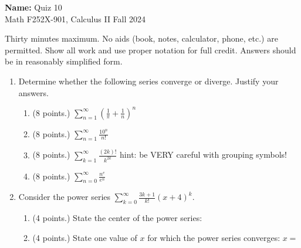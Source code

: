\documentclass[12pt]{article}
\newcommand{\ds}{\displaystyle}
\newcommand{\points}[1]{(#1 points.)}		%
\begin{document}
\pagestyle{plain}

\noindent \textbf{Name:} \underline{\hspace{15em}}		\hfill	Quiz 10 \\
           Math F252X-901, Calculus II  			\hfill	Fall 2024 	

                \vspace{1cm}
                
Thirty minutes maximum. No aids (book, notes,
calculator, phone, etc.) are permitted. Show all work and use proper
notation for full credit. Answers should be in reasonably simplified
form.

\begin{enumerate}

\item Determine whether the following series converge or
  diverge. Justify your answers.

  \begin{enumerate}

  \item \points{8} $\ds \sum_{n=1}^{\infty} \left( \frac{1}{\pi} + \frac{1}{n}
    \right)^n$
    \vfill
    
  \item \points{8} $\ds \sum_{n=1}^{\infty} \frac{10^n}{n!}$
    \vfill
    \newpage

  \item \points{8} $\ds \sum_{k=1}^{\infty} \frac{(2k)!}{k^{2k}}$ \hspace{0.2cm}
    hint: be VERY careful with grouping symbols!
    \vfill

  \item \points{8} $\ds \sum_{n=0}^{\infty} \frac{n^e}{e^n}$
    \vfill
    
  \end{enumerate}

\item Consider the power series $\ds \sum_{k=0}^{\infty}
  \frac{3k+1}{k!} (x+4)^k$.
  
  \begin{enumerate}
  \item \points{4} State the center of the power series: \underline{\hspace{3cm}}
  \item \points{4} State one value of $x$ for which the power series converges: $x=$\underline{\hspace{3cm}}
  \end{enumerate}
  
  
\end{enumerate}
\end{document}
